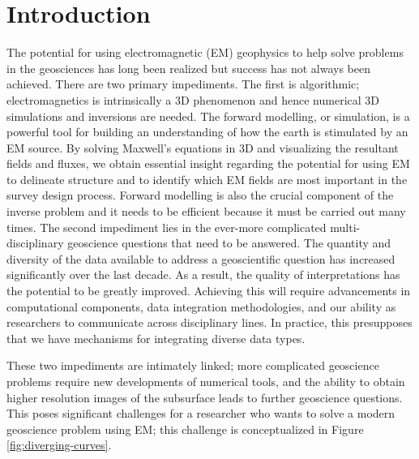 \documentclass[paper]{geophysics}
\begin{document}
\renewcommand{\figdir}{./figures} %

\section{Introduction}

The potential for using electromagnetic (EM) geophysics to help solve problems in the geosciences has long been realized but success has not always been achieved. There are two primary impediments. The first is algorithmic; electromagnetics is intrinsically a 3D phenomenon and hence numerical 3D simulations and inversions are needed. The forward modelling, or simulation, is a powerful tool for building an understanding of how the earth is stimulated by an EM source. By solving Maxwell's equations in 3D and visualizing the resultant fields and fluxes, we obtain essential insight regarding the potential for using EM to delineate structure and to identify which EM fields are most important in the survey design process. Forward modelling is also the crucial component of the inverse problem and it needs to be efficient because it must be carried out many times. The second impediment lies in the ever-more complicated multi-disciplinary geoscience questions that need to be answered. The quantity and diversity of the data available to address a geoscientific question has increased significantly over the last decade. As a result, the quality of interpretations has the potential to be greatly improved. Achieving this will require advancements in computational components, data integration methodologies, and our ability as researchers to communicate across disciplinary lines. In practice, this presupposes that we have mechanisms for integrating diverse data types.

These two impediments are intimately linked; more complicated geoscience problems require new developments of numerical tools, and the ability to obtain higher resolution images of the subsurface leads to further geoscience questions. This poses significant challenges for a researcher who wants to solve a modern geoscience problem using EM; this challenge is conceptualized in Figure \ref{fig:diverging-curves}.



\end{document}
